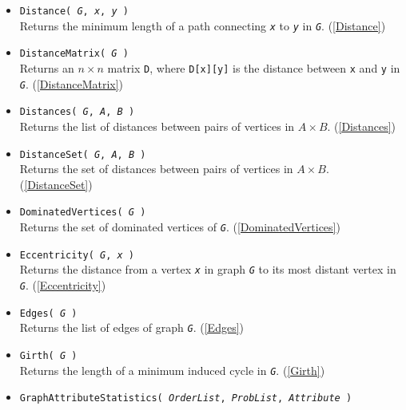 \documentclass[a4paper,11pt]{report}
\begin{document}
{{\begin{itemize}
\item \texttt{Distance( \mbox{\texttt{\mdseries\slshape G}}, \mbox{\texttt{\mdseries\slshape x}}, \mbox{\texttt{\mdseries\slshape y}} )}\\
 Returns the minimum length of a path connecting \mbox{\texttt{\mdseries\slshape x}} to \mbox{\texttt{\mdseries\slshape y}} in \mbox{\texttt{\mdseries\slshape G}}. (\ref{Distance}) 
\item \texttt{DistanceMatrix( \mbox{\texttt{\mdseries\slshape G}} )}\\
 Returns an $n\times n$ matrix \texttt{D}, where \texttt{D[x][y]} is the distance between \texttt{x} and \texttt{y} in \mbox{\texttt{\mdseries\slshape G}}. (\ref{DistanceMatrix}) 
\item \texttt{Distances( \mbox{\texttt{\mdseries\slshape G}}, \mbox{\texttt{\mdseries\slshape A}}, \mbox{\texttt{\mdseries\slshape B}} )}\\
 Returns the list of distances between pairs of vertices in $A\times B$. (\ref{Distances}) 
\item \texttt{DistanceSet( \mbox{\texttt{\mdseries\slshape G}}, \mbox{\texttt{\mdseries\slshape A}}, \mbox{\texttt{\mdseries\slshape B}} )}\\
 Returns the set of distances between pairs of vertices in $A\times B$. (\ref{DistanceSet}) 
\item \texttt{DominatedVertices( \mbox{\texttt{\mdseries\slshape G}} )}\\
 Returns the set of dominated vertices of \mbox{\texttt{\mdseries\slshape G}}. (\ref{DominatedVertices}) 
\item \texttt{Eccentricity( \mbox{\texttt{\mdseries\slshape G}}, \mbox{\texttt{\mdseries\slshape x}} )}\\
 Returns the distance from a vertex \mbox{\texttt{\mdseries\slshape x}} in graph \mbox{\texttt{\mdseries\slshape G}} to its most distant vertex in \mbox{\texttt{\mdseries\slshape G}}. (\ref{Eccentricity}) 
\item \texttt{Edges( \mbox{\texttt{\mdseries\slshape G}} )}\\
 Returns the list of edges of graph \mbox{\texttt{\mdseries\slshape G}}. (\ref{Edges}) 
\item \texttt{Girth( \mbox{\texttt{\mdseries\slshape G}} )}\\
 Returns the length of a minimum induced cycle in \mbox{\texttt{\mdseries\slshape G}}. (\ref{Girth}) 
\item \texttt{GraphAttributeStatistics( \mbox{\texttt{\mdseries\slshape OrderList}}, \mbox{\texttt{\mdseries\slshape ProbList}}, \mbox{\texttt{\mdseries\slshape Attribute}} )}\\

\end{itemize}}}
\end{document}
